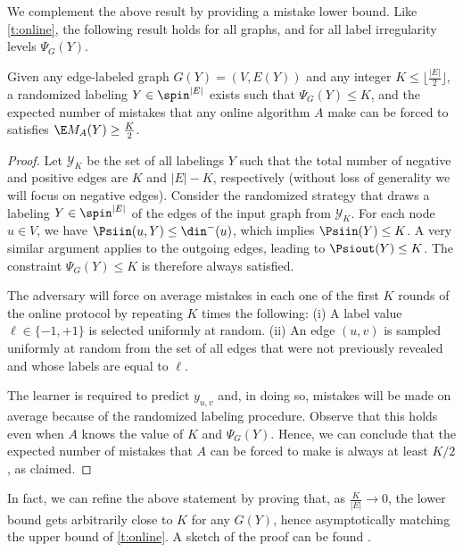 We complement the above result by providing a
mistake lower bound. Like \autoref{t:online}, the following result holds for all graphs, and for all
label irregularity levels $\Psi_G(Y)$.

\begin{theorem}\label{t:mistake_bound}
  Given any edge-labeled graph $G(Y) = (V,E(Y))$ and any integer $K \le \big\lfloor
  \tfrac{|E|}{2}\big\rfloor$, a randomized labeling $Y\in\spin^{|E|}$ exists such that $\Psi_G(Y)
  \leq K$, and the expected number of mistakes that any online algorithm $A$ make can be forced to 
  satisfies $\E M_A(Y) \ge \frac{K}{2}$.
\end{theorem}

\begin{proof}
  Let $\mathcal{Y}_K$ be the set of all labelings $Y$ such that the total number of negative and
  positive edges are $K$ and $|E|-K$, respectively (without loss of generality we will focus on
  negative edges). Consider the randomized strategy that draws a labeling $Y \in \spin^{|E|}$ of the
  edges of the input graph \uar{} from $\mathcal{Y}_K$. For each node $u \in V$, we have
  $\Psiin(u,Y) \le \din^-(u)$, which implies $\Psiin(Y) \le K$. A very similar argument applies to
  the outgoing edges, leading to $\Psiout(Y) \le K$. The constraint $\Psi_G(Y) \le K$ is therefore
  always satisfied.

  The adversary will force on average \shalf{} mistakes in each one of the first $K$ rounds of the
  online protocol by repeating $K$ times the following: (i) A label value $\ell\in\{-1,+1\}$ is
  selected uniformly at random. (ii) An edge $(u,v)$ is sampled uniformly at random from the set of
  all edges that were not previously revealed and whose labels are equal to $\ell$. 

  The learner is required to predict $y_{u,v}$ and, in doing so, \shalf{} mistakes will be made on
  average because of the randomized labeling procedure. Observe that this holds even when $A$ knows
  the value of $K$ and $\Psi_G(Y)$. Hence, we can conclude that the expected number of mistakes that
  $A$ can be forced to make is always at least $K/2$, as claimed.
\end{proof}

In fact, we can refine the above statement by proving that, as $\frac{K}{|E|} \rightarrow 0$, the
lower bound gets arbitrarily close to $K$ for any $G(Y)$, hence asymptotically matching the upper
bound of \autoref{t:online}. A sketch of the proof can be found .
